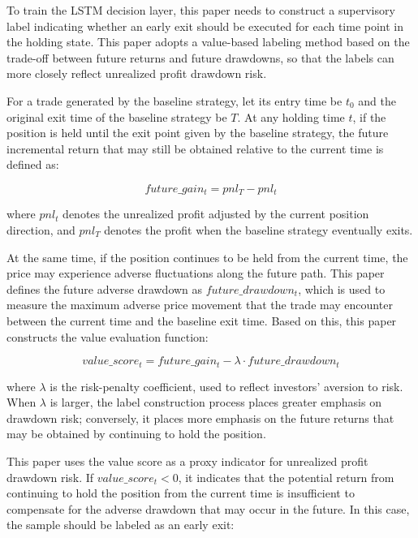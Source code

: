 \documentclass[12pt]{article}
\begin{document}
To train the LSTM decision layer, this paper needs to construct a supervisory label indicating 
whether an early exit should be executed for each time point in the holding state. This paper 
adopts a value-based labeling method based on the trade-off between future returns and future 
drawdowns, so that the labels can more closely reflect unrealized profit drawdown risk.

For a trade generated by the baseline strategy, let its entry time be $t_0$ and the original 
exit time of the baseline strategy be $T$. At any holding time $t$, if the position is held 
until the exit point given by the baseline strategy, the future incremental return that may 
still be obtained relative to the current time is defined as:

\begin{equation}
    future\_gain_t = pnl_T - pnl_t
\end{equation}

where $pnl_t$ denotes the unrealized profit adjusted by the current position direction, and 
$pnl_T$ denotes the profit when the baseline strategy eventually exits.

At the same time, if the position continues to be held from the current time, the price may 
experience adverse fluctuations along the future path. This paper defines the future adverse 
drawdown as $future\_drawdown_t$, which is used to measure the maximum adverse price movement 
that the trade may encounter between the current time and the baseline exit time. Based on 
this, this paper constructs the value evaluation function:

\begin{equation}
    value\_score_t = future\_gain_t - \lambda \cdot future\_drawdown_t
\end{equation}

where $\lambda$ is the risk-penalty coefficient, used to reflect investors' aversion to risk. 
When $\lambda$ is larger, the label construction process places greater emphasis on drawdown 
risk; conversely, it places more emphasis on the future returns that may be obtained by 
continuing to hold the position.

This paper uses the value score as a proxy indicator for unrealized profit drawdown risk. If 
$value\_score_t < 0$, it indicates that the potential return from continuing to hold the 
position from the current time is insufficient to compensate for the adverse drawdown that may 
occur in the future. In this case, the sample should be labeled as an early exit:
\end{document}
